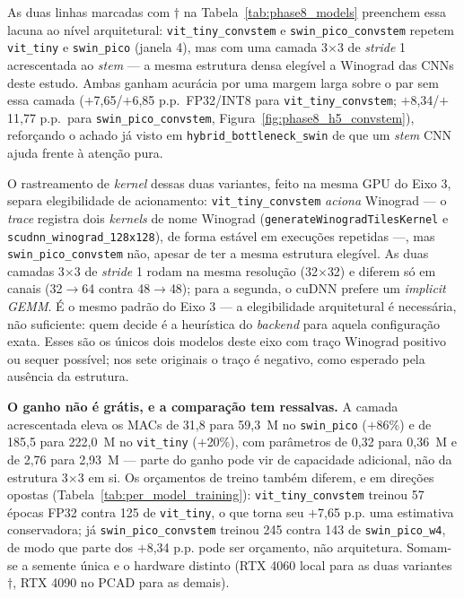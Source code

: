 \documentclass[conference]{IEEEtran}
\begin{document}
As duas linhas marcadas com $\dagger$ na Tabela~\ref{tab:phase8_models} preenchem essa lacuna ao
nível arquitetural: \texttt{vit\_tiny\_convstem} e \texttt{swin\_pico\_convstem} repetem
\texttt{vit\_tiny} e \texttt{swin\_pico} (janela 4), mas com uma camada 3$\times$3 de
\textit{stride} 1 acrescentada ao \textit{stem} --- a mesma estrutura densa elegível a Winograd das
CNNs deste estudo. Ambas ganham acurácia por uma margem larga sobre o par sem essa camada
($+$7,65/$+$6,85 p.p.\ FP32/INT8 para \texttt{vit\_tiny\_convstem}; $+$8,34/$+$11,77 p.p.\ para
\texttt{swin\_pico\_convstem}, Figura~\ref{fig:phase8_h5_convstem}), reforçando o achado já visto em \texttt{hybrid\_bottleneck\_swin}
de que um \textit{stem} CNN ajuda frente à atenção pura.

O rastreamento de \textit{kernel} dessas duas variantes, feito na mesma GPU do Eixo 3, separa
elegibilidade de acionamento: \texttt{vit\_tiny\_convstem} \emph{aciona} Winograd — o \textit{trace}
registra dois \textit{kernels} de nome Winograd (\texttt{generateWinograd\-Tiles\-Kernel} e
\texttt{scudnn\_winograd\_128x128}), de forma estável em execuções repetidas —, mas
\texttt{swin\_pico\_convstem} não, apesar de ter a mesma estrutura elegível. As duas camadas
3$\times$3 de \textit{stride} 1 rodam na mesma resolução (32$\times$32) e diferem só em canais
(32$\to$64 contra 48$\to$48); para a segunda, o cuDNN prefere um \textit{implicit GEMM}. É o mesmo
padrão do Eixo 3 — a elegibilidade arquitetural é necessária, não suficiente: quem decide é a
heurística do \textit{backend} para aquela configuração exata. Esses são os únicos dois modelos
deste eixo com traço Winograd positivo ou sequer possível; nos sete originais o traço é negativo,
como esperado pela ausência da estrutura.

\textbf{O ganho não é grátis, e a comparação tem ressalvas.} A camada acrescentada eleva os MACs de
31,8 para 59,3~M no \texttt{swin\_pico} ($+$86\%) e de 185,5 para 222,0~M no \texttt{vit\_tiny}
($+$20\%), com parâmetros de 0,32 para 0,36~M e de 2,76 para 2,93~M --- parte do ganho pode vir de
capacidade adicional, não da estrutura 3$\times$3 em si. Os orçamentos de treino também diferem,
e em direções opostas (Tabela~\ref{tab:per_model_training}): \texttt{vit\_tiny\_convstem} treinou
57 épocas FP32 contra 125 de \texttt{vit\_tiny}, o que torna seu $+$7,65 p.p. uma estimativa
conservadora; já \texttt{swin\_pico\_convstem} treinou 245 contra 143 de \texttt{swin\_pico\_w4},
de modo que parte dos $+$8,34 p.p. pode ser orçamento, não arquitetura. Somam-se a semente única e
o hardware distinto (RTX 4060 local para as duas variantes $\dagger$, RTX 4090 no PCAD para as
demais).
\end{document}
